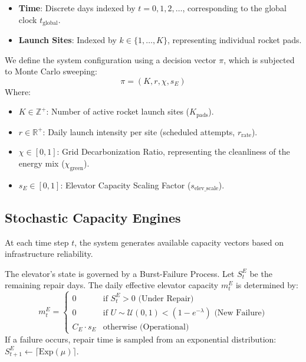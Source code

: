 \documentclass[11pt,letterpaper]{article}
\begin{document}
\begin{itemize}
    \item \textbf{Time}: Discrete days indexed by $t = 0, 1, 2, \dots$, corresponding to the global clock $t_{\text{global}}$.
    \item \textbf{Launch Sites}: Indexed by $k \in \{1, \dots, K\}$, representing individual rocket pads.
\end{itemize}

We define the system configuration using a decision vector $\pi$, which is subjected to Monte Carlo sweeping:
\[
\pi = (K, r, \chi, s_E)
\]
Where:
\begin{itemize}
    \item $K \in \mathbb{Z}^+$: Number of active rocket launch sites ($K_{\text{pads}}$).
    \item $r \in \mathbb{R}^+$: Daily launch intensity per site (scheduled attempts, $r_{\text{rate}}$).
    \item $\chi \in [0, 1]$: Grid Decarbonization Ratio, representing the cleanliness of the energy mix ($\chi_{\text{green}}$).
    \item $s_E \in [0, 1]$: Elevator Capacity Scaling Factor ($s_{\text{elev\_scale}}$).
\end{itemize}

\subsection{Stochastic Capacity Engines}
At each time step $t$, the system generates available capacity vectors based on infrastructure reliability.

The elevator's state is governed by a Burst-Failure Process. Let $S^E_t$ be the remaining repair days. The daily effective elevator capacity $m^E_t$ is determined by:
\[
m^E_t = 
\begin{cases} 
0 & \text{if } S^E_t > 0 \text{ (Under Repair)} \\
0 & \text{if } U \sim \mathcal{U}(0,1) < (1 - e^{-\lambda}) \text{ (New Failure)} \\
C_E \cdot s_E & \text{otherwise (Operational)}
\end{cases}
\]
If a failure occurs, repair time is sampled from an exponential distribution: $S^E_{t+1} \leftarrow \lceil \text{Exp}(\mu) \rceil$.
\end{document}
